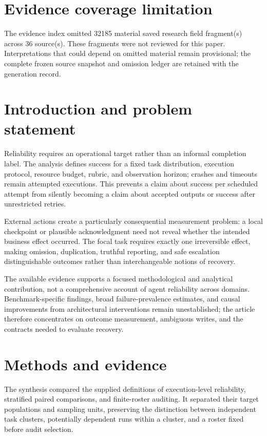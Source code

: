 \documentclass[11pt]{article}
\begin{document}
\section*{Evidence coverage limitation}
The evidence index omitted 32185 material saved research field fragment(s) across 36 source(s). These fragments were not reviewed for this paper. Interpretations that could depend on omitted material remain provisional; the complete frozen source snapshot and omission ledger are retained with the generation record.
\section{Introduction and problem statement}
Reliability requires an operational target rather than an informal completion label. The analysis defines success for a fixed task distribution, execution protocol, resource budget, rubric, and observation horizon; crashes and timeouts remain attempted executions. This prevents a claim about success per scheduled attempt from silently becoming a claim about accepted outputs or success after unrestricted retries.

External actions create a particularly consequential measurement problem: a local checkpoint or plausible acknowledgment need not reveal whether the intended business effect occurred. The focal task requires exactly one irreversible effect, making omission, duplication, truthful reporting, and safe escalation distinguishable outcomes rather than interchangeable notions of recovery.

The available evidence supports a focused methodological and analytical contribution, not a comprehensive account of agent reliability across domains. Benchmark-specific findings, broad failure-prevalence estimates, and causal improvements from architectural interventions remain unestablished; the article therefore concentrates on outcome measurement, ambiguous writes, and the contracts needed to evaluate recovery.

\section{Methods and evidence}
The synthesis compared the supplied definitions of execution-level reliability, stratified paired comparisons, and finite-roster auditing. It separated their target populations and sampling units, preserving the distinction between independent task clusters, potentially dependent runs within a cluster, and a roster fixed before audit selection.
\end{document}
